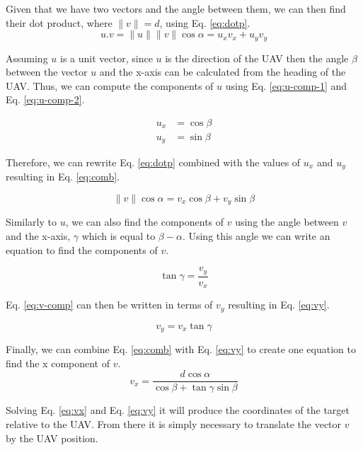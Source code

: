 Given that we have two vectors and the angle between them, we can then find their dot product, where
$\parallel v \parallel = d$, using Eq. \ref{eq:dotp}.
\begin{equation}
	u . v = \parallel u \parallel \parallel v \parallel \cos \alpha = u_x v_x + u_y v_y
	\label{eq:dotp}
\end{equation}

Assuming $u$ is a unit vector, since $u$ is the direction of the UAV then the angle $\beta$ between the vector $u$
and the x-axis can be calculated from the heading of the UAV. Thus, we can compute the components of $u$ using Eq. 
\ref{eq:u-comp-1} and Eq. \ref{eq:u-comp-2}. 

\begin{align}
	u_x &= \cos \beta
	\label{eq:u-comp-1} \\
	u_y &= \sin \beta
	\label{eq:u-comp-2}
\end{align}

Therefore, we can rewrite Eq. \ref{eq:dotp} combined with the values of $u_x$ and $u_y$ resulting in Eq. \ref{eq:comb}. 

\begin{equation}
	\parallel v \parallel \cos \alpha =  v_x \cos \beta +  v_y \sin \beta
	\label{eq:comb}
\end{equation}

Similarly to $u$, we can also find the components of $v$ using the angle between $v$ and the x-axis, $\gamma$ which
is equal to $\beta - \alpha$. Using this angle we can write an equation to find the components of $v$. 

\begin{equation}
	\tan \gamma = \frac{v_y}{v_x}
	\label{eq:v-comp}
\end{equation}

Eq. \ref{eq:v-comp} can then be written in terms of $v_y$ resulting in Eq. \ref{eq:vy}. 

\begin{equation}
	v_y = v_x \tan \gamma
	\label{eq:vy}
\end{equation}

Finally, we can combine Eq. \ref{eq:comb} with Eq. \ref{eq:vy} to create one equation to find the x component of $v$. 
\begin{equation}
	v_x = \frac{d \cos \alpha}{\cos \beta + \tan \gamma \sin \beta}
	\label{eq:vx}
\end{equation}

Solving Eq. \ref{eq:vx} and Eq. \ref{eq:vy} it will produce the coordinates of the target relative to the UAV. 
From there it is simply necessary to translate the vector $v$ by the UAV position.

